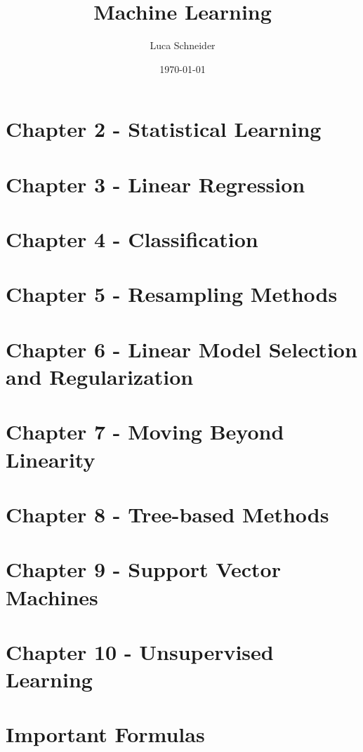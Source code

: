 \documentclass{article}
\title{Machine Learning}
\author{Luca Schneider}
\date{\today}
\begin{document}
	
	
	\maketitle
	
	\newpage
	
	\tableofcontents
	
	\newpage

	
	\section{Chapter 2 - Statistical Learning}
	
	
	
	\section{Chapter 3 - Linear Regression}
	
	
	
	\section{Chapter 4 - Classification}
	
	
	
	\section{Chapter 5 - Resampling Methods}
	
	
	
	\section{Chapter 6 - Linear Model Selection and Regularization}
	
	
	
	\section{Chapter 7 - Moving Beyond Linearity}
	
	
	
	\section{Chapter 8 - Tree-based Methods}
	
	
	
	\section{Chapter 9 - Support Vector Machines}
	
	
	
	\section{Chapter 10 - Unsupervised Learning}
	
	
	
	\section{Important Formulas}
	
	
	
\end{document}
